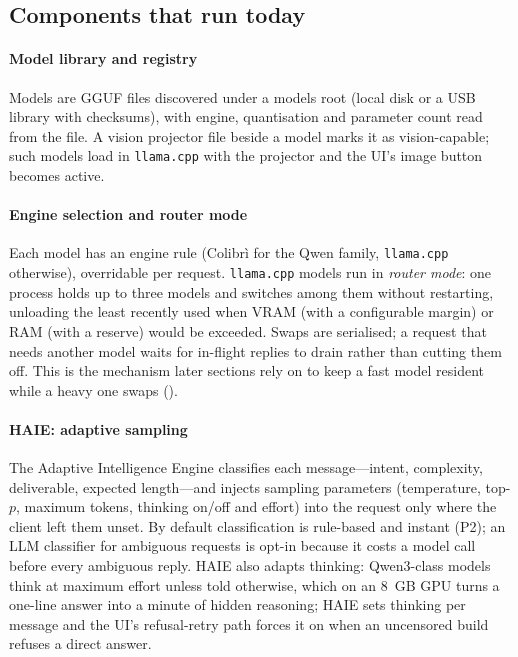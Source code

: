 \subsection{Components that run today}

\paragraph{Model library and registry} Models are GGUF files discovered under a models root (local disk or a USB library with checksums), with engine, quantisation and parameter count read from the file. A vision projector file beside a model marks it as vision-capable; such models load in \texttt{llama.cpp} with the projector and the UI's image button becomes active.

\paragraph{Engine selection and router mode} Each model has an engine rule (Colibr\`i for the Qwen family, \texttt{llama.cpp} otherwise), overridable per request. \texttt{llama.cpp} models run in \emph{router mode}: one process holds up to three models and switches among them without restarting, unloading the least recently used when VRAM (with a configurable margin) or RAM (with a reserve) would be exceeded. Swaps are serialised; a request that needs another model waits for in-flight replies to drain rather than cutting them off. This is the mechanism later sections rely on to keep a fast model resident while a heavy one swaps ().

\paragraph{HAIE: adaptive sampling} The \hivi{} Adaptive Intelligence Engine classifies each message---intent, complexity, deliverable, expected length---and injects sampling parameters (temperature, top-$p$, maximum tokens, thinking on/off and effort) into the request only where the client left them unset. By default classification is rule-based and instant (P2); an LLM classifier for ambiguous requests is opt-in because it costs a model call before every ambiguous reply. HAIE also adapts thinking: Qwen3-class models think at maximum effort unless told otherwise, which on an 8~GB GPU turns a one-line answer into a minute of hidden reasoning; HAIE sets thinking per message and the UI's refusal-retry path forces it on when an uncensored build refuses a direct answer.

